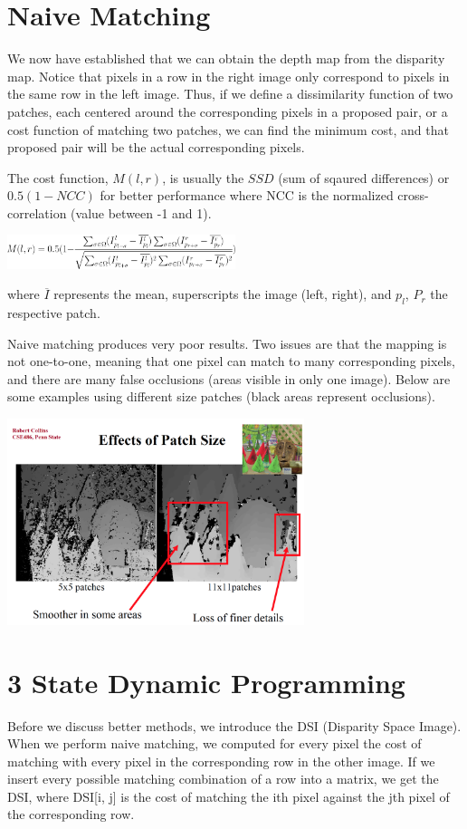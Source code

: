 \documentclass{article}
\begin{document}
\section{Naive Matching}
We now have established that we can obtain the depth map from the disparity map. Notice that pixels in a row in the right image only correspond to pixels in the same row in the left image. Thus, if we define a dissimilarity function of two patches, each centered around the corresponding pixels in a proposed pair, or a cost function of matching two patches, we can find the minimum cost, and that proposed pair will be the actual corresponding pixels. 

The cost function, $M(l, r)$, is usually the $SSD$ (sum of sqaured differences) or $0.5(1-NCC)$ for better performance where NCC is the normalized cross-correlation (value between -1 and 1). 

\begin{center}
    \includegraphics[width=0.5\textwidth]{NCC.png}
\end{center}

where $\overline{I}$ represents the mean, superscripts the image (left, right), and $p_l$, $P_r$ the respective patch.

Naive matching produces very poor results. Two issues are that the mapping is not one-to-one, meaning that one pixel can match to many corresponding pixels, and there are many false occlusions (areas visible in only one image). Below are some examples using different size patches (black areas represent occlusions).

\begin{center}
    \includegraphics[width=0.65\textwidth]{patch.png}
\end{center}

\section{3 State Dynamic Programming}
Before we discuss better methods, we introduce the DSI (Disparity Space Image). When we perform naive matching, we computed for every pixel the cost of matching with every pixel in the corresponding row in the other image. If we insert every possible matching combination of a row into a matrix, we get the DSI, where DSI[i, j] is the cost of matching the ith pixel against the jth pixel of the corresponding row. 
\end{document}
